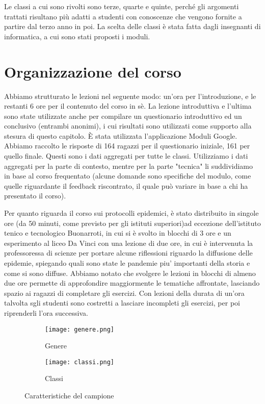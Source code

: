 Le classi a cui sono rivolti sono terze, quarte e quinte, perché gli argomenti trattati risultano più adatti a studenti con conoscenze che vengono fornite a partire dal terzo anno in poi. La scelta delle classi è stata fatta dagli insegnanti di informatica, a cui sono stati proposti i moduli.


\section{Organizzazione del corso}
Abbiamo strutturato le lezioni nel seguente modo: un’ora per l’introduzione, e le restanti 6 ore per il contenuto del corso in sè. La lezione introduttiva e l’ultima sono state utilizzate anche per compilare un questionario introduttivo ed un conclusivo (entrambi anonimi), i cui risultati sono utilizzati come supporto alla stesura di questo capitolo. È stata utilizzata l’applicazione Moduli Google. Abbiamo raccolto le risposte di 164 ragazzi per il questionario iniziale, 161 per quello finale. Questi sono i dati aggregati per tutte le classi. Utilizziamo i dati aggregati per la parte  di contesto, mentre per la parte "tecnica" li suddividiamo in base al corso frequentato (alcune domande sono specifiche del modulo, come quelle riguardante il feedback riscontrato, il quale può variare in base a chi ha presentato il corso). 

Per quanto riguarda il corso sui protocolli epidemici, è stato distribuito in singole ore (da 50 minuti, come previsto per gli istituti superiori)ad eccezione dell'istituto tenico e tecnologico Buonarroti, in cui si è svolto in blocchi di 3 ore e un esperimento al liceo Da Vinci con una lezione di due ore, in cui è intervenuta la professoressa di scienze per portare alcune riflessioni riguardo la diffusione delle epidemie, spiegando quali sono state le pandemie piu' importanti della storia e come si sono diffuse. Abbiamo notato che svolgere le lezioni in blocchi di almeno due ore permette di approfondire maggiormente le tematiche affrontate, lasciando spazio ai ragazzi di completare gli esercizi. Con lezioni della durata di un'ora talvolta sgli studenti sono costretti a lasciare incompleti gli esercizi, per poi riprenderli l'ora successiva. 

\begin{figure}[!ht]
    \begin{subfigure}{.5\textwidth}
        \centering
        \texttt{[image: genere.png]}
        \caption{Genere}
        \label{fig:genere}
    \end{subfigure}\hfill
    \begin{subfigure}{.5\textwidth}
        \centering
        \texttt{[image: classi.png]}
        \caption{Classi}
        \label{fig:classi}
    \end{subfigure}
    \caption{Caratteristiche del campione} 
\end{figure}
